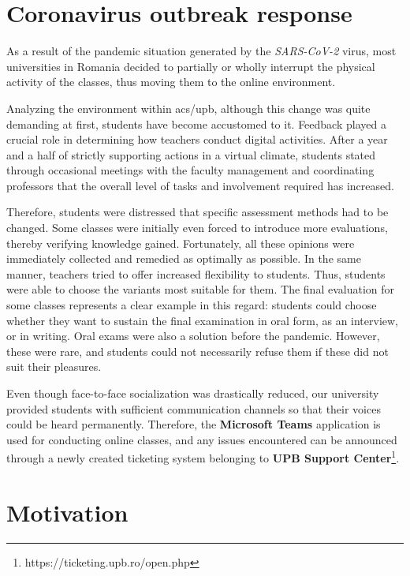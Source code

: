 \section{Coronavirus outbreak response} \label{2:covid_response}

    As a result of the pandemic situation generated by the \textit{SARS-CoV-2} virus, most universities in Romania decided to partially or wholly interrupt the physical activity of the classes, thus moving them to the online environment.
    
	Analyzing the environment within \acrshort{acs}/\acrshort{upb}, although this change was quite demanding at first, students have become accustomed to it. Feedback played a crucial role in determining how teachers conduct digital activities. After a year and a half of strictly supporting actions in a virtual climate, students stated through occasional meetings with the faculty management and coordinating professors that the overall level of tasks and involvement required has increased.
	
	Therefore, students were distressed that specific assessment methods had to be changed. Some classes were initially even forced to introduce more evaluations, thereby verifying knowledge gained. Fortunately, all these opinions were immediately collected and remedied as optimally as possible. In the same manner, teachers tried to offer increased flexibility to students. Thus, students were able to choose the variants most suitable for them. The final evaluation for some classes represents a clear example in this regard: students could choose whether they want to sustain the final examination in oral form, as an interview, or in writing. Oral exams were also a solution before the pandemic. However, these were rare, and students could not necessarily refuse them if these did not suit their pleasures.
	
	Even though face-to-face socialization was drastically reduced, our university provided students with sufficient communication channels so that their voices could be heard permanently. Therefore, the \textbf{Microsoft Teams} application is used for conducting online classes, and any issues encountered can be announced through a newly created ticketing system belonging to \textbf{UPB Support Center}\footnote{https://ticketing.upb.ro/open.php}.

\section{Motivation} \label{2:motivation}

